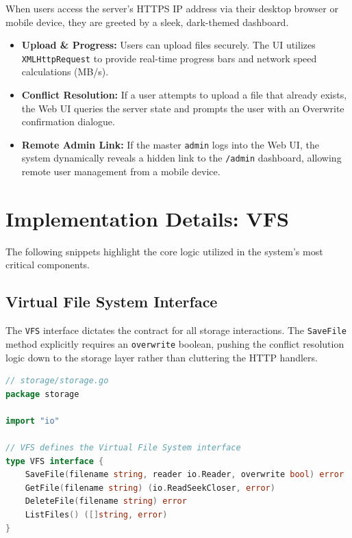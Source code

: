 \documentclass[12pt, a4paper]{article}
\begin{document}
When users access the server's HTTPS IP address via their desktop browser or mobile device, they are greeted by a sleek, dark-themed dashboard. 
\begin{itemize}
    \item \textbf{Upload \& Progress:} Users can upload files securely. The UI utilizes \texttt{XMLHttpRequest} to provide real-time progress bars and network speed calculations (MB/s).
    \item \textbf{Conflict Resolution:} If a user attempts to upload a file that already exists, the Web UI queries the server state and prompts the user with an Overwrite confirmation dialogue.
    \item \textbf{Remote Admin Link:} If the master \texttt{admin} logs into the Web UI, the system dynamically reveals a hidden link to the \texttt{/admin} dashboard, allowing remote user management from a mobile device.
\end{itemize}


\newpage
\section{Implementation Details: VFS}
The following snippets highlight the core logic utilized in the system's most critical components.

\subsection{Virtual File System Interface}
The \texttt{VFS} interface dictates the contract for all storage interactions. The \texttt{SaveFile} method explicitly requires an \texttt{overwrite} boolean, pushing the conflict resolution logic down to the storage layer rather than cluttering the HTTP handlers.

\begin{lstlisting}[language=Go]
// storage/storage.go
package storage

import "io"

// VFS defines the Virtual File System interface
type VFS interface {
    SaveFile(filename string, reader io.Reader, overwrite bool) error
    GetFile(filename string) (io.ReadSeekCloser, error)
    DeleteFile(filename string) error
    ListFiles() ([]string, error)
}
\end{lstlisting}
\end{document}
